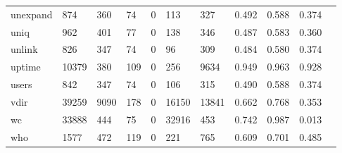 \begin{longtable}{lp{1.10cm}p{1.10cm}p{1.10cm}p{1.10cm}p{1.10cm}p{1.10cm}p{1.10cm}p{1.10cm}p{1.10cm}p{1.10cm}}
unexpand  &                    874 &                                360 &                                74 &                                0 &                               113 &                             327 &                             0.492 &                                 0.588 &                               0.374 \\
uniq      &                    962 &                                401 &                                77 &                                0 &                               138 &                             346 &                             0.487 &                                 0.583 &                               0.360 \\
unlink    &                    826 &                                347 &                                74 &                                0 &                                96 &                             309 &                             0.484 &                                 0.580 &                               0.374 \\
uptime    &                  10379 &                                380 &                               109 &                                0 &                               256 &                            9634 &                             0.949 &                                 0.963 &                               0.928 \\
users     &                    842 &                                347 &                                74 &                                0 &                               106 &                             315 &                             0.490 &                                 0.588 &                               0.374 \\
vdir      &                  39259 &                               9090 &                               178 &                                0 &                             16150 &                           13841 &                             0.662 &                                 0.768 &                               0.353 \\
wc        &                  33888 &                                444 &                                75 &                                0 &                             32916 &                             453 &                             0.742 &                                 0.987 &                               0.013 \\
who       &                   1577 &                                472 &                               119 &                                0 &                               221 &                             765 &                             0.609 &                                 0.701 &                               0.485 \\

\end{longtable}
